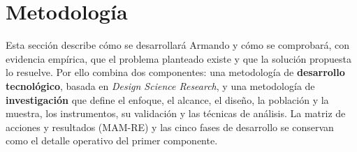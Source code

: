 \documentclass[stu,12pt,floatsintext]{apa7}
\begin{document}
















\section{Metodología}

Esta sección describe cómo se desarrollará Armando y cómo se comprobará, con evidencia empírica, que el problema planteado existe y que la solución propuesta lo resuelve. Por ello combina dos componentes: una metodología de \textbf{desarrollo tecnológico}, basada en \textit{Design Science Research}, y una metodología de \textbf{investigación} que define el enfoque, el alcance, el diseño, la población y la muestra, los instrumentos, su validación y las técnicas de análisis. La matriz de acciones y resultados (MAM-RE) y las cinco fases de desarrollo se conservan como el detalle operativo del primer componente.
\end{document}
